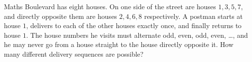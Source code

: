 Maths Boulevard has eight houses. On one side of the street are houses $1,3,5,7$, and directly opposite them are houses $2,4,6,8$ respectively. A postman starts at house $1$, delivers to each of the other houses exactly once, and finally returns to house $1$. The house numbers he visits must alternate odd, even, odd, even, \dots, and he may never go from a house straight to the house directly opposite it. How many different delivery sequences are possible?
